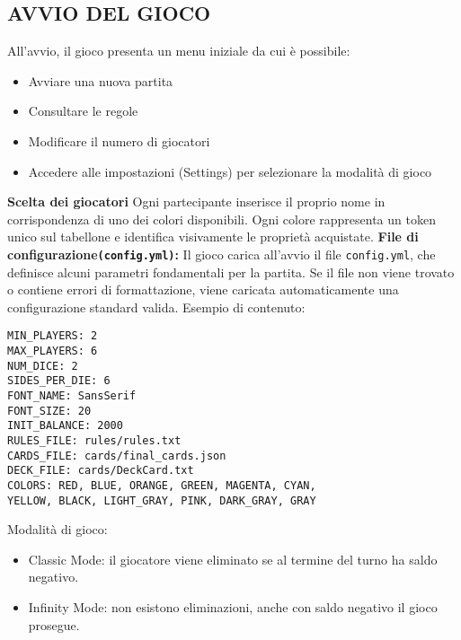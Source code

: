 \subsection{AVVIO DEL GIOCO}
All’avvio, il gioco presenta un menu iniziale da cui è possibile:\newline
\begin{itemize}
    \item Avviare una nuova partita
    \item Consultare le regole
    \item Modificare il numero di giocatori
    \item Accedere alle impostazioni (Settings) per selezionare la modalità di gioco
\end{itemize}
\textbf{Scelta dei giocatori}\newline
Ogni partecipante inserisce il proprio nome in corrispondenza di uno dei colori disponibili. Ogni colore rappresenta un token unico sul tabellone e identifica visivamente le proprietà acquistate.\newline
\textbf{File di configurazione\texttt{(config.yml)}:}\newline
Il gioco carica all’avvio il file \texttt{config.yml}, che definisce alcuni parametri fondamentali per la partita. Se il file non viene trovato o contiene errori di formattazione, viene caricata automaticamente una configurazione standard valida.\newline
Esempio di contenuto:\newline
\begin{verbatim}
MIN_PLAYERS: 2
MAX_PLAYERS: 6
NUM_DICE: 2
SIDES_PER_DIE: 6
FONT_NAME: SansSerif
FONT_SIZE: 20
INIT_BALANCE: 2000
RULES_FILE: rules/rules.txt
CARDS_FILE: cards/final_cards.json
DECK_FILE: cards/DeckCard.txt
COLORS: RED, BLUE, ORANGE, GREEN, MAGENTA, CYAN, 
YELLOW, BLACK, LIGHT_GRAY, PINK, DARK_GRAY, GRAY
\end{verbatim}
Modalità di gioco:\newline
\begin{itemize}
    \item Classic Mode: il giocatore viene eliminato se al termine del turno ha saldo negativo.
    \item Infinity Mode: non esistono eliminazioni, anche con saldo negativo il gioco prosegue.
\end{itemize}
